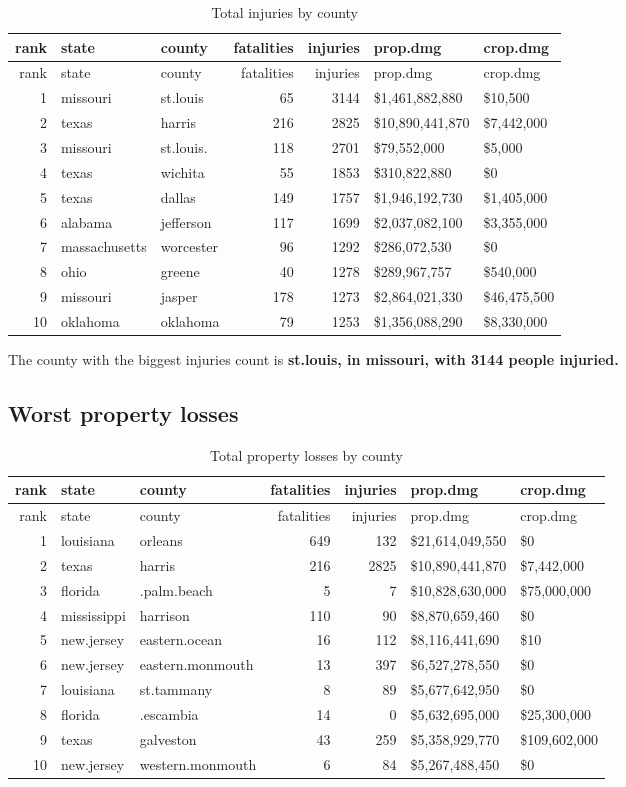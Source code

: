 \documentclass[]{article}
\begin{document}
\begin{longtable}[]{@{}rllrrll@{}}
\caption{Total injuries by county}\tabularnewline
\toprule
rank & state & county & fatalities & injuries & prop.dmg &
crop.dmg\tabularnewline
\midrule
\endfirsthead
\toprule
rank & state & county & fatalities & injuries & prop.dmg &
crop.dmg\tabularnewline
\midrule
\endhead
1 & missouri & st.louis & 65 & 3144 & \$1,461,882,880 &
\$10,500\tabularnewline
2 & texas & harris & 216 & 2825 & \$10,890,441,870 &
\$7,442,000\tabularnewline
3 & missouri & st.louis. & 118 & 2701 & \$79,552,000 &
\$5,000\tabularnewline
4 & texas & wichita & 55 & 1853 & \$310,822,880 & \$0\tabularnewline
5 & texas & dallas & 149 & 1757 & \$1,946,192,730 &
\$1,405,000\tabularnewline
6 & alabama & jefferson & 117 & 1699 & \$2,037,082,100 &
\$3,355,000\tabularnewline
7 & massachusetts & worcester & 96 & 1292 & \$286,072,530 &
\$0\tabularnewline
8 & ohio & greene & 40 & 1278 & \$289,967,757 & \$540,000\tabularnewline
9 & missouri & jasper & 178 & 1273 & \$2,864,021,330 &
\$46,475,500\tabularnewline
10 & oklahoma & oklahoma & 79 & 1253 & \$1,356,088,290 &
\$8,330,000\tabularnewline
\bottomrule
\end{longtable}

The county with the biggest injuries count is \textbf{st.louis, in
missouri, with 3144 people injuried.}

\subsection{Worst property losses}\label{worst-property-losses}

\begin{longtable}[]{@{}rllrrll@{}}
\caption{Total property losses by county}\tabularnewline
\toprule
rank & state & county & fatalities & injuries & prop.dmg &
crop.dmg\tabularnewline
\midrule
\endfirsthead
\toprule
rank & state & county & fatalities & injuries & prop.dmg &
crop.dmg\tabularnewline
\midrule
\endhead
1 & louisiana & orleans & 649 & 132 & \$21,614,049,550 &
\$0\tabularnewline
2 & texas & harris & 216 & 2825 & \$10,890,441,870 &
\$7,442,000\tabularnewline
3 & florida & .palm.beach & 5 & 7 & \$10,828,630,000 &
\$75,000,000\tabularnewline
4 & mississippi & harrison & 110 & 90 & \$8,870,659,460 &
\$0\tabularnewline
5 & new.jersey & eastern.ocean & 16 & 112 & \$8,116,441,690 &
\$10\tabularnewline
6 & new.jersey & eastern.monmouth & 13 & 397 & \$6,527,278,550 &
\$0\tabularnewline
7 & louisiana & st.tammany & 8 & 89 & \$5,677,642,950 &
\$0\tabularnewline
8 & florida & .escambia & 14 & 0 & \$5,632,695,000 &
\$25,300,000\tabularnewline
9 & texas & galveston & 43 & 259 & \$5,358,929,770 &
\$109,602,000\tabularnewline
10 & new.jersey & western.monmouth & 6 & 84 & \$5,267,488,450 &
\$0\tabularnewline
\bottomrule
\end{longtable}
\end{document}
